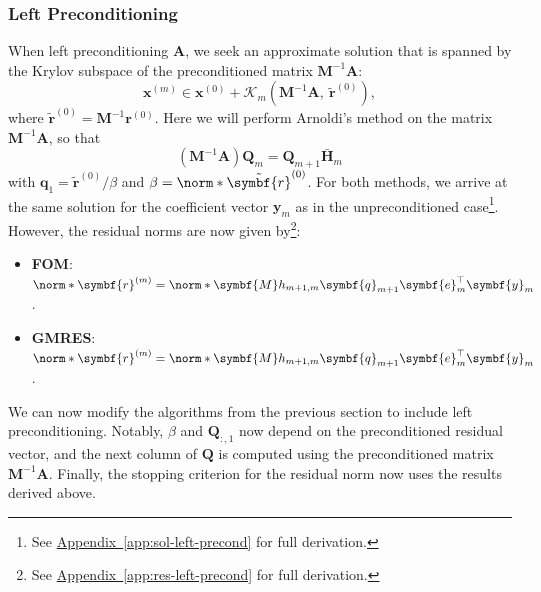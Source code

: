 \documentclass{article}
\begin{document}
\subsubsection{Left Preconditioning}
When left preconditioning \(\symbf{A}\), we seek an approximate
solution that is spanned by the Krylov subspace of the preconditioned
matrix \(\symbf{M}^{-1} \symbf{A}\):
\begin{equation*}
    \symbf{x}^{\left( m \right)} \in \symbf{x}^{\left( 0 \right)} + \mathcal{K}_m\left( \symbf{M}^{-1} \symbf{A},\: \tilde{\symbf{r}}^{\left( 0 \right)} \right),
\end{equation*}
where \(\tilde{\symbf{r}}^{\left( 0 \right)} = \symbf{M}^{-1} \symbf{r}^{\left( 0 \right)}\).
Here we will perform Arnoldi's method on the matrix \(\symbf{M}^{-1} \symbf{A}\),
so that
\begin{equation*}
    \left( \symbf{M}^{-1} \symbf{A} \right) \symbf{Q}_m = \symbf{Q}_{m+1} \bar{\symbf{H}}_m
\end{equation*}
with \(\symbf{q}_1 = \tilde{\symbf{r}}^{\left( 0 \right)}/\beta\) and
\(\beta = \norm*{\tilde{\symbf{r}}^{\left( 0 \right)}}\). For both methods,
we arrive at the same solution for the coefficient vector \(\symbf{y}_m\)
as in the unpreconditioned case\footnote{See \hyperref[app:sol-left-precond]{Appendix~\ref*{app:sol-left-precond}} for full derivation.}.
However, the residual norms are now given by\footnote{See \hyperref[app:res-left-precond]{Appendix~\ref*{app:res-left-precond}} for full derivation.}:
\begin{itemize}
    \item \textbf{FOM}: \(\norm*{\symbf{r}^{\left( m \right)}} = \norm*{\symbf{M} h_{m+1,m} \symbf{q}_{m+1} \symbf{e}_m^\top \symbf{y}_m}\).
    \item \textbf{GMRES}: \(\norm*{\symbf{r}^{\left( m \right)}} = \norm*{\symbf{M} h_{m+1,m} \symbf{q}_{m+1} \symbf{e}_m^\top \symbf{y}_m}\).
\end{itemize}
We can now modify the algorithms from the previous section to include
left preconditioning. Notably, \(\beta\) and \(\symbf{Q}_{:,1}\) now
depend on the preconditioned residual vector, and the next column of
\(\symbf{Q}\) is computed using the preconditioned matrix
\(\symbf{M}^{-1} \symbf{A}\). Finally, the stopping criterion for the
residual norm now uses the results derived above.
\end{document}
